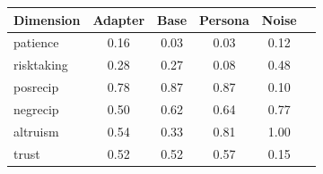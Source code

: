 \begin{tabular}{lccccc}
\toprule
Dimension & Adapter & Base & Persona & Noise \\
\midrule
patience & 0.16 & 0.03 & 0.03 & 0.12 \\
risktaking & 0.28 & 0.27 & 0.08 & 0.48 \\
posrecip & 0.78 & 0.87 & 0.87 & 0.10 \\
negrecip & 0.50 & 0.62 & 0.64 & 0.77 \\
altruism & 0.54 & 0.33 & 0.81 & 1.00 \\
trust & 0.52 & 0.52 & 0.57 & 0.15 \\
\bottomrule
\end{tabular}
